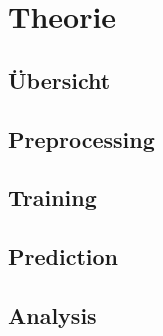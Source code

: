 \chapter{Theorie}

\section{Übersicht}

\section{Preprocessing}

\section{Training}

\section{Prediction}

\section{Analysis}

